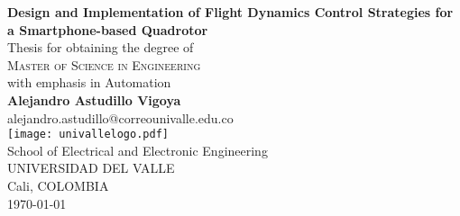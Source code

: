 \begin{titlepage}
\begin{center}
 {\LARGE\bfseries Design and Implementation of Flight Dynamics Control Strategies for a Smartphone-based Quadrotor\\}
 \vspace{2.5cm}
{Thesis for obtaining the degree of} \\[2cm]
\textsc{\Large{{Master of Science in Engineering}}} \\[5pt]
{\large  with emphasis in Automation} \\[2pt]
 \vfill
 \vspace{0.5cm}
 \vspace{1.5cm}
 {\Large\bfseries Alejandro Astudillo Vigoya}\\[5pt]
 alejandro.astudillo@correounivalle.edu.co\\[14pt]
 \vspace{1.5cm}
\texttt{[image: univallelogo.pdf]}\\[5pt]
{School of Electrical and Electronic Engineering}\\[5pt]
{UNIVERSIDAD DEL VALLE}\\[5pt]
{Cali, COLOMBIA}\\
 \vfill
 \vspace{0.3cm}
{\today} %
\end{center}
\end{titlepage}

\setcounter{page}{2} 

\newpage
\thispagestyle{empty}
\mbox{}


